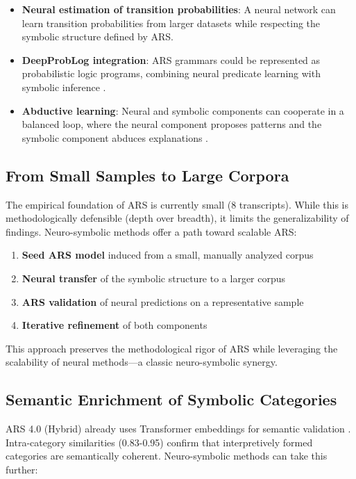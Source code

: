 \documentclass[12pt,a4paper]{article}
\begin{document}
\begin{itemize}
    \item \textbf{Neural estimation of transition probabilities}: A neural network 
    can learn transition probabilities from larger datasets while respecting the 
    symbolic structure defined by ARS.
    \item \textbf{DeepProbLog integration}: ARS grammars could be represented 
    as probabilistic logic programs, combining neural predicate learning with 
    symbolic inference \citep{manhaeve2018deepproblog}.
    \item \textbf{Abductive learning}: Neural and symbolic components can 
    cooperate in a balanced loop, where the neural component proposes patterns 
    and the symbolic component abduces explanations \citep{zhou2022abductive}.
\end{itemize}

\subsection{From Small Samples to Large Corpora}

The empirical foundation of ARS is currently small (8 transcripts). While this 
is methodologically defensible (depth over breadth), it limits the generalizability 
of findings. Neuro-symbolic methods offer a path toward scalable ARS:

\begin{enumerate}
    \item \textbf{Seed ARS model} induced from a small, manually analyzed corpus
    \item \textbf{Neural transfer} of the symbolic structure to a larger corpus
    \item \textbf{ARS validation} of neural predictions on a representative sample
    \item \textbf{Iterative refinement} of both components
\end{enumerate}

This approach preserves the methodological rigor of ARS while leveraging the 
scalability of neural methods—a classic neuro-symbolic synergy.

\subsection{Semantic Enrichment of Symbolic Categories}

ARS 4.0 (Hybrid) already uses Transformer embeddings for semantic validation 
\citep{koop2024hybrid}. Intra-category similarities (0.83-0.95) confirm that 
interpretively formed categories are semantically coherent. Neuro-symbolic 
methods can take this further:
\end{document}
